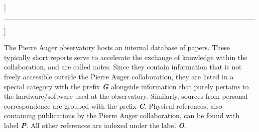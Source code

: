 
[\hrule\vspace{-0.5cm}]
\printbibheading

The Pierre Auger observatory hosts an internal database of papers. These 
typically short reports serve to accelerate the exchange of knowledge within the
collaboration, and are called \GAP notes. Since they contain information that is
not freely accessible outside the Pierre Auger collaboration, they are listed in
a special category with the prefix \textbf{\textit{G}} alongside information 
that purely pertains to the hardware/software used at the observatory. 
Similarly, sources from personal correspondence are grouped with the prefix 
\textbf{\textit{C}}. Physical references, also containing publications by the 
Pierre Auger collaboration, can be found with label \textbf{\textit{P}}. All 
other references are indexed under the label \textbf{\textit{O}}.

\newrefcontext[labelprefix=G]
\printbibliography[keyword={auger},title={GAP Notes},heading=subbibliography]

\newrefcontext[labelprefix=C]
\printbibliography[keyword={private},title={Personal Correspondence},heading=subbibliography]

\newrefcontext[labelprefix=P]
\printbibliography[keyword={phys},notkeyword={auger},title={Physics References},heading=subbibliography]

\newrefcontext[labelprefix=O]
\printbibliography[notkeyword={private},notkeyword={phys},notkeyword={auger},title={Other References},heading=subbibliography]

\cleardoublepage
